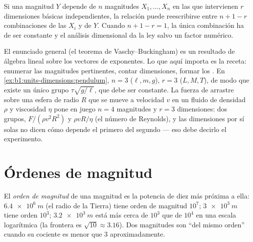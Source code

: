 \begin{proposition}\label{prop:b1:units-dimensions:pi}
Si una magnitud $Y$ depende de $n$ magnitudes $X_1, \dots, X_n$ en las que
intervienen $r$ dimensiones básicas independientes, la relación puede
reescribirse entre $n + 1 - r$ combinaciones  de las $X_i$ y
de $Y$. Cuando $n + 1 - r = 1$, la única combinación ha de ser constante y
el análisis dimensional da la ley salvo un factor numérico.
\end{proposition}
\admitted

\begin{remark}\label{rem:b1:units-dimensions:pi}
El enunciado general (el teorema de Vaschy--Buckingham) es un resultado de
álgebra lineal sobre los vectores de exponentes. Lo que aquí importa es la
receta: enumerar las magnitudes pertinentes, contar dimensiones, formar
los . En \cref{ex:b1:units-dimensions:pendulum},
$n = 3$ ($\ell, m, g$), $r = 3$ ($L, M, T$), de modo que existe un único
grupo $\tau\sqrt{g/\ell}$, que debe ser constante. La fuerza de arrastre
sobre una esfera de radio $R$ que se mueve a velocidad $v$ en un fluido de
densidad $\rho$ y viscosidad $\eta$ pone en juego $n = 4$ magnitudes y
$r = 3$ dimensiones: dos grupos, $F/(\rho v^2 R^2)$ y $\rho v R/\eta$ (el
número de Reynolds), y las dimensiones por sí solas no dicen cómo depende
el primero del segundo --- eso debe decirlo el experimento.
\end{remark}

\section{Órdenes de magnitud}

\begin{definition}\label{def:b1:units-dimensions:oom}
El \emph{orden de magnitud} de una magnitud es la potencia de diez más
próxima a ella: $\qty{6.4e6}{m}$ (el radio de la Tierra) tiene orden de
magnitud $10^7$; $\qty{3e3}{m}$ tiene orden $10^3$; $\qty{3.2e3}{m}$ está
más cerca de $10^3$ que de $10^4$ en una escala logarítmica (la frontera
es $\sqrt{10} \approx 3.16$). Dos magnitudes son ``del mismo orden''
cuando su cociente es menor que $3$ aproximadamente.
\end{definition}

